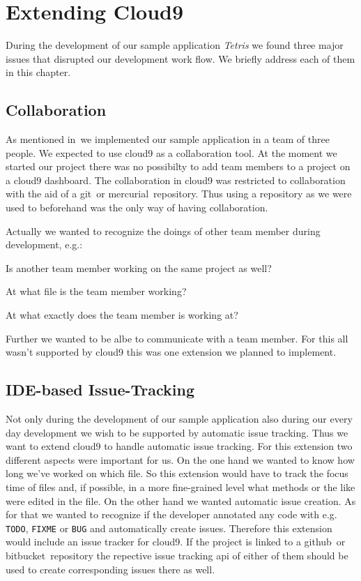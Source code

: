 \section{Extending Cloud9}
\label{sec:Approaches}
During the development of our sample application \emph{Tetris} we found three major issues that disrupted our development work flow.
We briefly address each of them in this chapter.

\subsection{Collaboration}
As mentioned in~ we implemented our sample application in a team of three people.
We expected to use cloud9 as a collaboration tool.
At the moment we started our project there was no possibilty to add team members to a project on a cloud9 dashboard.
The collaboration in cloud9 was restricted to collaboration with the aid of a git~\needcite or mercurial~\needcite repository.
Thus using a repository as we were used to beforehand was the only way of having collaboration.

Actually we wanted to recognize the doings of other team member during development, e.g.:
\begin{packed_itemize}
    \item Is another team member working on the same project as well?
    \item At what file is the team member working?
    \item At what exactly does the team member is working at?
\end{packed_itemize}
Further we wanted to be albe to communicate with a team member.
For this all wasn't supported by cloud9 this was one extension we planned to implement.

\subsection{IDE-based Issue-Tracking}
Not only during the development of our sample application also during our every day development we wish to be supported by automatic issue tracking.
Thus we want to extend cloud9 to handle automatic issue tracking.
For this extension two different aspects were important for us.
On the one hand we wanted to know how long we've worked on which file.
So this extension would have to track the focus time of files and, if possible, in a more fine-grained level what methods or the like were edited in the file.
On the other hand we wanted automatic issue creation.
As for that we wanted to recognize if the developer annotated any code with e.g. \texttt{TODO}, \texttt{FIXME} or \texttt{BUG} and automatically create issues.
Therefore this extension would include an issue tracker for cloud9.
If the project is linked to a github~\needcite or bitbucket~\needcite repository the repective issue tracking api of either of them should be used to create corresponding issues there as well.

